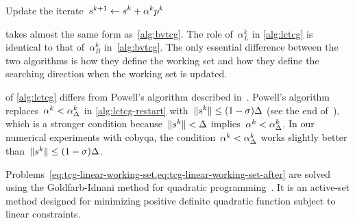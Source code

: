 \begin{algorithm}
{        Update the iterate~$\sstep[k + 1] \gets \sstep[k] + \alpha^k \pstep[k]$\;
    }
\end{algorithm}

 takes almost the same form as~\cref{alg:bvtcg}.
The role of~$\alpha_L^k$ in \cref{alg:lctcg} is identical to that of~$\alpha_B^k$ in~\cref{alg:bvtcg}.
The only essential difference between the two algorithms is how they define the working set and how
they define the searching direction when the working set is updated.

 of \cref{alg:lctcg} differs from Powell's algorithm described in~\cite[\S~3,\S~5]{Powell_2015}.
Powell's algorithm replaces~$\alpha^k < \alpha_{\rad}^k$ in \cref{alg:lctcg-restart} with~$\norm{\sstep[k]} \le (1-\sigma)\rad$ (see the end of~\cite[\S~3]{Powell_2015}),
which is a stronger condition because~$\norm{\sstep[k]} < \rad$ implies~$\alpha^k < \alpha_{\rad}^k$.
In our numerical experiments with \gls{cobyqa}, the condition~$\alpha^k < \alpha_{\rad}^k$ works slightly better than~$\norm{\sstep[k]} \le (1-\sigma)\rad$.

Problems~\cref{eq:tcg-linear-working-set,eq:tcg-linear-working-set-after} are solved using the Goldfarb-Idnani method for quadratic programming~\cite{Goldfarb_Idnani_1983}.
It is an active-set method designed for minimizing positive definite quadratic function subject to linear constraints.

